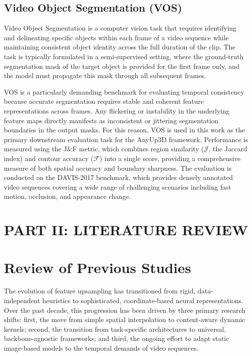 \subsection{Video Object Segmentation (VOS)}

Video Object Segmentation is a computer vision task that
requires identifying and delineating specific objects within
each frame of a video sequence while maintaining consistent
object identity across the full duration of the clip.
The task is typically formulated in a semi-supervised setting,
where the ground-truth segmentation mask of the target object is
provided for the first frame only, and the model must propagate
this mask through all subsequent frames.

VOS is a particularly demanding benchmark for evaluating
temporal consistency because accurate segmentation requires
stable and coherent feature representations across frames.
Any flickering or instability in the underlying feature maps
directly manifests as inconsistent or jittering segmentation
boundaries in the output masks.
For this reason, VOS is used in this work as the primary
downstream evaluation task for the AnyUp3D framework.
Performance is measured using the J\&F metric, which combines
region similarity ($\mathcal{J}$, the Jaccard index) and
contour accuracy ($\mathcal{F}$) into a single score, providing
a comprehensive measure of both spatial accuracy and boundary
sharpness.
The evaluation is conducted on the DAVIS-2017 benchmark, which
provides densely annotated video sequences covering a wide range
of challenging scenarios including fast motion, occlusion, and
appearance change.
\section*{PART II: LITERATURE REVIEW}

\section{Review of Previous Studies}

The evolution of feature upsampling has transitioned from
rigid, data-independent heuristics to sophisticated,
coordinate-based neural representations.
Over the past decade, this progression has been driven by three
primary research shifts: first, the move from simple spatial
interpolation to content-aware dynamic kernels; second, the
transition from task-specific architectures to universal,
backbone-agnostic frameworks; and third, the ongoing effort to
adapt static image-based models to the temporal demands of
video sequences.

